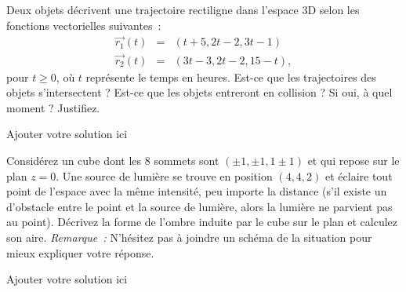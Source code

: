 \documentclass[12pt,addpoints]{exam}
\begin{document}
\begin{questions}
\question[15]
Deux objets décrivent une trajectoire rectiligne dans l'espace 3D selon les fonctions vectorielles suivantes~:
\begin{eqnarray*}
  \vec{r_1}(t) & = & (t + 5, 2t - 2, 3t - 1) \\
  \vec{r_2}(t) & = & (3t - 3, 2t - 2, 15 - t),
\end{eqnarray*}
pour $t \geq 0$, où $t$ représente le temps en heures. Est-ce que les trajectoires des objets s'intersectent ? Est-ce que les objets entreront en collision ? Si oui, à quel moment ? Justifiez.
\begin{solution}
Ajouter votre solution ici
\end{solution}

\question[20]
Considérez un cube dont les 8 sommets sont $(\pm 1, \pm 1, 1 \pm 1)$ et qui repose sur le plan $z = 0$. Une source de lumière se trouve en position $(4,4,2)$ et éclaire tout point de l'espace avec la même intensité, peu importe la distance (s'il existe un d'obstacle entre le point et la source de lumière, alors la lumière ne parvient pas au point). Décrivez la forme de l'ombre induite par le cube sur le plan et calculez son aire. \emph{Remarque~:} N'hésitez pas à joindre un schéma de la situation pour mieux expliquer votre réponse.
\begin{solution}
Ajouter votre solution ici
\end{solution}

\end{questions}
\end{document}
